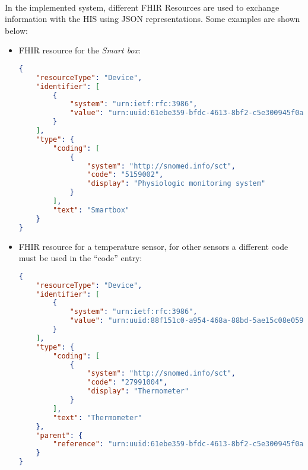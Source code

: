 \paragraph{} In the implemented system, different \acs{FHIR} Resources are used to exchange information with the \acs{HIS} using \acs{JSON} representations. Some examples are shown below:

\begin{itemize}
    \item \acs{FHIR} resource for the \textit{Smart box}:
    \begin{lstlisting}[language=json]            
{ 
    "resourceType": "Device", 
    "identifier": [ 
        { 
            "system": "urn:ietf:rfc:3986", 
            "value": "urn:uuid:61ebe359-bfdc-4613-8bf2-c5e300945f0a"  
        } 
    ], 
    "type": { 
        "coding": [ 
            { 
                "system": "http://snomed.info/sct", 
                "code": "5159002", 
                "display": "Physiologic monitoring system" 
            } 
        ], 
        "text": "Smartbox" 
    } 
}
    \end{lstlisting} 

    \item \acs{FHIR} resource for a temperature sensor, for other sensors a different code must be used in the ``code'' entry:
    \begin{lstlisting}[language=json]            
{ 
    "resourceType": "Device", 
    "identifier": [ 
        { 
            "system": "urn:ietf:rfc:3986", 
            "value": "urn:uuid:88f151c0-a954-468a-88bd-5ae15c08e059"  
        } 
    ], 
    "type": { 
        "coding": [ 
            { 
                "system": "http://snomed.info/sct", 
                "code": "27991004", 
                "display": "Thermometer" 
            } 
        ], 
        "text": "Thermometer" 
    }, 
    "parent": { 
        "reference": "urn:uuid:61ebe359-bfdc-4613-8bf2-c5e300945f0a" 
    } 
}
    \end{lstlisting} 


\end{itemize}
